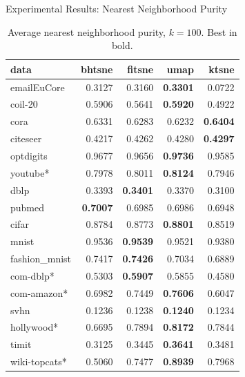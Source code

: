 \documentclass{beamer}
\begin{document}
\begin{frame}[fragile]{Experimental Results: Nearest Neighborhood Purity}
\fontsize{8pt}{7.9}\selectfont
\begin{table}[tb]
  \centering
  \begin{tabular}{lrrrr}
    \toprule
data & bhtsne & fitsne & umap & ktsne \\ \midrule
emailEuCore & 0.3127 & 0.3160 & \bfseries 0.3301 & 0.0722 \\
coil-20 & 0.5906 & 0.5641 & \bfseries 0.5920 & 0.4922 \\
cora & 0.6331 & 0.6283 & 0.6232 & \bfseries 0.6404 \\
citeseer & 0.4217 & 0.4262 & 0.4280 & \bfseries 0.4297 \\
optdigits & 0.9677 & 0.9656 & \bfseries 0.9736 & 0.9585 \\
youtube* & 0.7978 & 0.8011 & \bfseries 0.8124 & 0.7946 \\
dblp & 0.3393 & \bfseries 0.3401 & 0.3370 & 0.3100 \\
pubmed & \bfseries 0.7007 & 0.6985 & 0.6986 & 0.6948 \\
cifar & 0.8784 & 0.8773 & \bfseries 0.8801 & 0.8519 \\
mnist & 0.9536 & \bfseries 0.9539 & 0.9521 & 0.9380 \\
fashion\_mnist & 0.7417 & \bfseries 0.7426 & 0.7034 & 0.6889 \\
com-dblp* & 0.5303 & \bfseries 0.5907 & 0.5855 & 0.4580 \\
com-amazon* & 0.6982 & 0.7449 & \bfseries 0.7606 & 0.6047 \\
svhn & 0.1236 & 0.1238 & \bfseries 0.1240 & 0.1234 \\
hollywood* & 0.6695 & 0.7894 & \bfseries 0.8172 & 0.7844 \\
timit & 0.3125 & 0.3445 & \bfseries 0.3641 & 0.3481 \\
wiki-topcats* & 0.5060 & 0.7477 & \bfseries 0.8939 & 0.7968 \\
\bottomrule
  \end{tabular}
  \caption{Average nearest neighborhood purity, $k = 100$. Best in bold.}
\label{tab:comp}
\end{table}
\end{frame}
\end{document}
